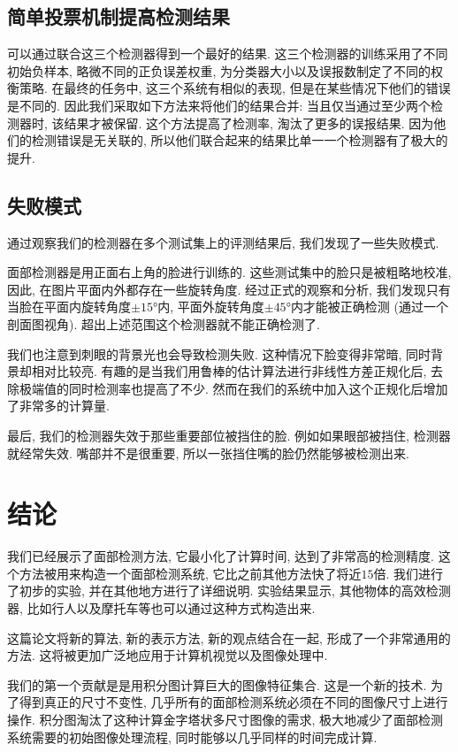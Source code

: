\documentclass[a4paper,utf8,11pt, onecolumn]{ctexart}
\begin{document}
\subsection{简单投票机制提高检测结果}
可以通过联合这三个检测器得到一个最好的结果. 这三个检测器的训练采用了不同初始负样本, 略微不同的正负误差权重, 为分类器大小以及误报数制定了不同的权衡策略. 在最终的任务中, 这三个系统有相似的表现, 但是在某些情况下他们的错误是不同的. 因此我们采取如下方法来将他们的结果合并: 当且仅当通过至少两个检测器时, 该结果才被保留. 这个方法提高了检测率, 淘汰了更多的误报结果. 因为他们的检测错误是无关联的, 所以他们联合起来的结果比单一一个检测器有了极大的提升.

\subsection{失败模式}
通过观察我们的检测器在多个测试集上的评测结果后, 我们发现了一些失败模式.

面部检测器是用正面右上角的脸进行训练的. 这些测试集中的脸只是被粗略地校准, 因此, 在图片平面内外都存在一些旋转角度. 经过正式的观察和分析, 我们发现只有当脸在平面内旋转角度$\pm\ang{15}$内, 平面外旋转角度$\pm\ang{45}$内才能被正确检测 (通过一个剖面图视角). 超出上述范围这个检测器就不能正确检测了.

我们也注意到刺眼的背景光也会导致检测失败. 这种情况下脸变得非常暗, 同时背景却相对比较亮. 有趣的是当我们用鲁棒的估计算法进行非线性方差正规化后, 去除极端值的同时检测率也提高了不少. 然而在我们的系统中加入这个正规化后增加了非常多的计算量.

最后, 我们的检测器失效于那些重要部位被挡住的脸. 例如如果眼部被挡住, 检测器就经常失效. 嘴部并不是很重要, 所以一张挡住嘴的脸仍然能够被检测出来.

\section{结论}\label{sec:discussion}
我们已经展示了面部检测方法, 它最小化了计算时间, 达到了非常高的检测精度. 这个方法被用来构造一个面部检测系统, 它比之前其他方法快了将近$15$倍. 我们进行了初步的实验, 并在其他地方进行了详细说明. 实验结果显示, 其他物体的高效检测器, 比如行人以及摩托车等也可以通过这种方式构造出来.

这篇论文将新的算法, 新的表示方法, 新的观点结合在一起, 形成了一个非常通用的方法. 这将被更加广泛地应用于计算机视觉以及图像处理中.

我们的第一个贡献是是用积分图计算巨大的图像特征集合. 这是一个新的技术. 为了得到真正的尺寸不变性, 几乎所有的面部检测系统必须在不同的图像尺寸上进行操作. 积分图淘汰了这种计算金字塔状多尺寸图像的需求, 极大地减少了面部检测系统需要的初始图像处理流程, 同时能够以几乎同样的时间完成计算.
\end{document}
